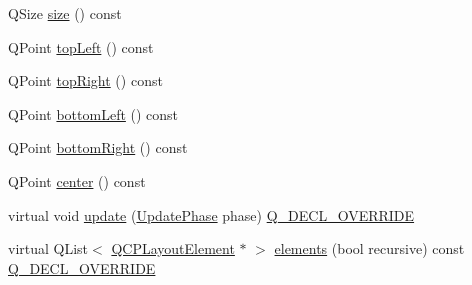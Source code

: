 \begin{DoxyCompactItemize}
\item 
Q\+Size \mbox{\hyperlink{class_q_c_p_axis_rect_a7a8289346eb612f422c704f8b75cf479}{size}} () const
\item 
Q\+Point \mbox{\hyperlink{class_q_c_p_axis_rect_a5a847b3ddeca3abec38d3838fefb0dbd}{top\+Left}} () const
\item 
Q\+Point \mbox{\hyperlink{class_q_c_p_axis_rect_a7aa221967549ba71b98c465bf8234758}{top\+Right}} () const
\item 
Q\+Point \mbox{\hyperlink{class_q_c_p_axis_rect_ab15d4311d6535ccd7af504dc0e2b98c6}{bottom\+Left}} () const
\item 
Q\+Point \mbox{\hyperlink{class_q_c_p_axis_rect_a36dac884ec8fa3a3a2f3842ca7b7d32d}{bottom\+Right}} () const
\item 
Q\+Point \mbox{\hyperlink{class_q_c_p_axis_rect_ade3aef874bafcec6dd16174fba44c0b1}{center}} () const
\item 
virtual void \mbox{\hyperlink{class_q_c_p_axis_rect_add049d464b9ef2ccdc638adc4ccb4aca}{update}} (\mbox{\hyperlink{class_q_c_p_layout_element_a0d83360e05735735aaf6d7983c56374d}{Update\+Phase}} phase) \mbox{\hyperlink{qcustomplot_8h_a42cc5eaeb25b85f8b52d2a4b94c56f55}{Q\+\_\+\+D\+E\+C\+L\+\_\+\+O\+V\+E\+R\+R\+I\+DE}}
\item 
virtual Q\+List$<$ \mbox{\hyperlink{class_q_c_p_layout_element}{Q\+C\+P\+Layout\+Element}} $\ast$ $>$ \mbox{\hyperlink{class_q_c_p_axis_rect_a3aee067fd105f2fa8de9eb8024435ac5}{elements}} (bool recursive) const \mbox{\hyperlink{qcustomplot_8h_a42cc5eaeb25b85f8b52d2a4b94c56f55}{Q\+\_\+\+D\+E\+C\+L\+\_\+\+O\+V\+E\+R\+R\+I\+DE}}
\end{DoxyCompactItemize}
